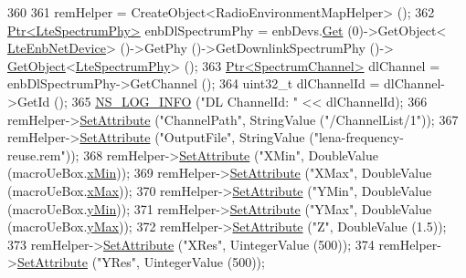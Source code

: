 \begin{DoxyCode}
360 
361       remHelper = CreateObject<RadioEnvironmentMapHelper> ();
362       \hyperlink{classns3_1_1Ptr}{Ptr<LteSpectrumPhy>} enbDlSpectrumPhy = enbDevs.\hyperlink{classns3_1_1NetDeviceContainer_a677d62594b5c9d2dea155cc5045f4d0b}{Get} (0)->GetObject<
      \hyperlink{classns3_1_1LteEnbNetDevice}{LteEnbNetDevice}> ()->GetPhy ()->GetDownlinkSpectrumPhy ()->
      \hyperlink{classns3_1_1Object_a13e18c00017096c8381eb651d5bd0783}{GetObject}<\hyperlink{classns3_1_1LteSpectrumPhy}{LteSpectrumPhy}> ();
363       \hyperlink{classns3_1_1Ptr}{Ptr<SpectrumChannel>} dlChannel = enbDlSpectrumPhy->GetChannel ();
364       uint32\_t dlChannelId = dlChannel->GetId ();
365       \hyperlink{group__logging_gafbd73ee2cf9f26b319f49086d8e860fb}{NS\_LOG\_INFO} (\textcolor{stringliteral}{"DL ChannelId: "} << dlChannelId);
366       remHelper->\hyperlink{classns3_1_1ObjectBase_ac60245d3ea4123bbc9b1d391f1f6592f}{SetAttribute} (\textcolor{stringliteral}{"ChannelPath"}, StringValue (\textcolor{stringliteral}{"/ChannelList/1"}));
367       remHelper->\hyperlink{classns3_1_1ObjectBase_ac60245d3ea4123bbc9b1d391f1f6592f}{SetAttribute} (\textcolor{stringliteral}{"OutputFile"}, StringValue (\textcolor{stringliteral}{"lena-frequency-reuse.rem"}));
368       remHelper->\hyperlink{classns3_1_1ObjectBase_ac60245d3ea4123bbc9b1d391f1f6592f}{SetAttribute} (\textcolor{stringliteral}{"XMin"}, DoubleValue (macroUeBox.\hyperlink{classns3_1_1Box_a1fd6a43d53258323331d34da600ff1c5}{xMin}));
369       remHelper->\hyperlink{classns3_1_1ObjectBase_ac60245d3ea4123bbc9b1d391f1f6592f}{SetAttribute} (\textcolor{stringliteral}{"XMax"}, DoubleValue (macroUeBox.\hyperlink{classns3_1_1Box_a50021049c756e770329145b25d9533a2}{xMax}));
370       remHelper->\hyperlink{classns3_1_1ObjectBase_ac60245d3ea4123bbc9b1d391f1f6592f}{SetAttribute} (\textcolor{stringliteral}{"YMin"}, DoubleValue (macroUeBox.\hyperlink{classns3_1_1Box_a3865ed092f941186823539c9979002f8}{yMin}));
371       remHelper->\hyperlink{classns3_1_1ObjectBase_ac60245d3ea4123bbc9b1d391f1f6592f}{SetAttribute} (\textcolor{stringliteral}{"YMax"}, DoubleValue (macroUeBox.\hyperlink{classns3_1_1Box_a001fd430a14b19efe925c818a332e392}{yMax}));
372       remHelper->\hyperlink{classns3_1_1ObjectBase_ac60245d3ea4123bbc9b1d391f1f6592f}{SetAttribute} (\textcolor{stringliteral}{"Z"}, DoubleValue (1.5));
373       remHelper->\hyperlink{classns3_1_1ObjectBase_ac60245d3ea4123bbc9b1d391f1f6592f}{SetAttribute} (\textcolor{stringliteral}{"XRes"}, UintegerValue (500));
374       remHelper->\hyperlink{classns3_1_1ObjectBase_ac60245d3ea4123bbc9b1d391f1f6592f}{SetAttribute} (\textcolor{stringliteral}{"YRes"}, UintegerValue (500));

\end{DoxyCode}
